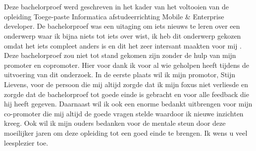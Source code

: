 
\chapter*{}%
\label{ch:voorwoord}

Deze bachelorproef werd geschreven in het kader van het voltooien van de opleiding Toege-paste Informatica afstudeerrichting Mobile \& Enterprise developer.
De bachelorproef was een uitaging om iets nieuws te leren over een onderwerp waar ik bijna niets tot iets over wist, ik heb dit onderwerp gekozen omdat het iets compleet anders is en dit het zeer intersant maakten voor mij . Deze bachelorproef zou niet tot stand gekomen zijn zonder de hulp van mijn promoter en copromoter. Hier voor dank ik voor al wie geholpen heeft tijdens de uitvoering van dit onderzoek.
In de eerste plaats wil ik mijn promotor, Stijn Lievens, voor de persoon die mij altijd zorgde dat ik mijn foxus niet verliesde en zorgde dat de bachelorproef tot goede einde is gebracht en voor alle feedback die hij heeft gegeven. Daarnaast wil ik ook een enorme bedankt uitbrengen voor mijn co-promoter die mij altijd de goede vragen stelde waardoor ik nieuwe inzichten kreeg. Ook wil ik mijn ouders bedanken voor de mentale steun door deze moeilijker jaren om deze opleiding tot een goed einde te brengen.
\newline
Ik wens u veel leesplezier toe.